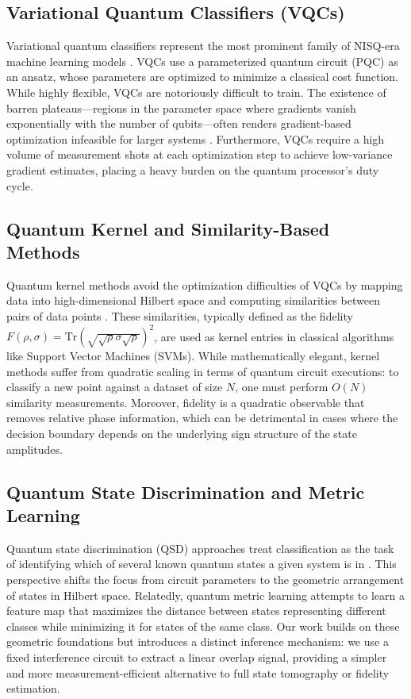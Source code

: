 \documentclass[conference]{IEEEtran}
\begin{document}
\subsection{Variational Quantum Classifiers (VQCs)}

Variational quantum classifiers represent the most prominent family of NISQ-era machine learning models \cite{benedetti2019parameterized,abbas2021power}. VQCs use a parameterized quantum circuit (PQC) as an ansatz, whose parameters are optimized to minimize a classical cost function. While highly flexible, VQCs are notoriously difficult to train. The existence of barren plateaus—regions in the parameter space where gradients vanish exponentially with the number of qubits—often renders gradient-based optimization infeasible for larger systems \cite{mcclean2018barren}. Furthermore, VQCs require a high volume of measurement shots at each optimization step to achieve low-variance gradient estimates, placing a heavy burden on the quantum processor's duty cycle.

\subsection{Quantum Kernel and Similarity-Based Methods}

Quantum kernel methods avoid the optimization difficulties of VQCs by mapping data into high-dimensional Hilbert space and computing similarities between pairs of data points \cite{schuld2019feature,havlicek2019supervised}. These similarities, typically defined as the fidelity $F(\rho, \sigma) = \text{Tr}(\sqrt{\sqrt{\rho}\sigma\sqrt{\rho}})^2$, are used as kernel entries in classical algorithms like Support Vector Machines (SVMs). While mathematically elegant, kernel methods suffer from quadratic scaling in terms of quantum circuit executions: to classify a new point against a dataset of size $N$, one must perform $O(N)$ similarity measurements. Moreover, fidelity is a quadratic observable that removes relative phase information, which can be detrimental in cases where the decision boundary depends on the underlying sign structure of the state amplitudes.

\subsection{Quantum State Discrimination and Metric Learning}

Quantum state discrimination (QSD) approaches treat classification as the task of identifying which of several known quantum states a given system is in \cite{sergioli2019binary,gonzalez2021classification}. This perspective shifts the focus from circuit parameters to the geometric arrangement of states in Hilbert space. Relatedly, quantum metric learning attempts to learn a feature map that maximizes the distance between states representing different classes while minimizing it for states of the same class. Our work builds on these geometric foundations but introduces a distinct inference mechanism: we use a fixed interference circuit to extract a linear overlap signal, providing a simpler and more measurement-efficient alternative to full state tomography or fidelity estimation.
\end{document}
